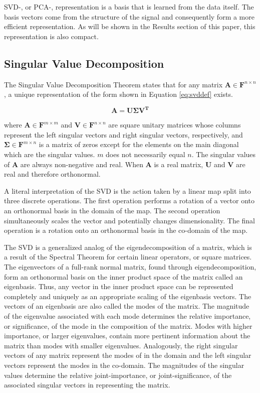\documentclass[conference]{IEEEtran}
\begin{document}
    SVD-, or PCA-, representation is a basis that is learned from the data itself. The basis vectors come from the structure of the signal and consequently form a more efficient representation. As will be shown in the Results section of this paper, this representation is also compact.
    
    \subsection{Singular Value Decomposition}
    The Singular Value Decomposition Theorem states that for any matrix $\mathbf{A} \in \mathbf{F}^{n \times n}$, a unique representation of the form shown in Equation \ref{eq:svddef} exists.

     \begin{equation}
     \mathbf{A} = \mathbf{U\Sigma }{\mathbf{V}^\mathbf{T}}
     \label{eq:svddef}
     \end{equation}

    where $\mathbf{A} \in \mathbf{F}^{m \times m}$ and $\mathbf{V} \in \mathbf{F}^{n \times n}$ are square unitary
    matrices whose columns represent the left singular vectors and right singular vectors, respectively, and $\mathbf{\Sigma} \in \mathbf{F}^{m \times n}$ is a matrix of zeros except for the elements on the main diagonal which are the singular values. $m$ does not necessarily equal $n$. The singular values of $\mathbf{A}$ are always non-negative and real. When $\mathbf{A}$ is a real matrix, $\mathbf{U}$ and $\mathbf{V}$ are real and therefore orthonormal.

    A literal interpretation of the SVD is the action taken by a linear map split into three discrete operations. The first operation performs a rotation of a vector onto an orthonormal basis in the domain of the map. The second operation simultaneously scales the vector and potentially changes dimensionality. The final operation is a rotation onto an orthonormal basis in the co-domain of the map.

    The SVD is a generalized analog of the eigendecomposition of a matrix, which is a result of the Spectral Theorem for certain linear operators, or square matrices. The eigenvectors of a full-rank normal matrix, found through eigendecomposition, form an orthonormal basis on the inner product space of the matrix called an eigenbasis. Thus, any vector in the inner product space can be represented completely and uniquely as an appropriate scaling of the eigenbasis vectors. The vectors of an eigenbasis are also called the modes of the matrix. The magnitude of the eigenvalue associated with each mode determines the relative importance, or significance, of the mode in the composition of the matrix. Modes with higher importance, or larger eigenvalues, contain more pertinent information about the matrix than modes with smaller eigenvalues. Analogously, the right singular vectors of any matrix represent the modes of in the domain and the left singular vectors represent the modes in the co-domain. The magnitudes of the singular values determine the relative joint-importance, or joint-significance, of the associated singular vectors in representing the matrix.
    
\end{document}
